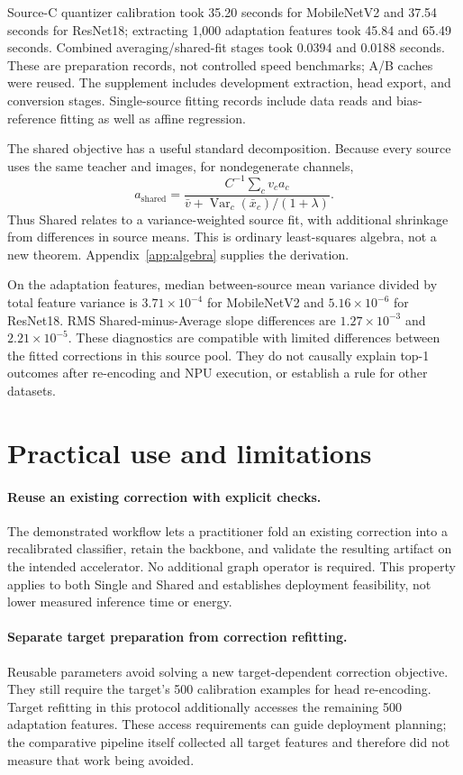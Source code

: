 \documentclass[10pt,twocolumn]{article}
\newcommand{\Var}{\operatorname{Var}}
\begin{document}
Source-C quantizer calibration took 35.20 seconds for MobileNetV2 and 37.54 seconds for ResNet18; extracting 1,000 adaptation features took 45.84 and 65.49 seconds. Combined averaging/shared-fit stages took 0.0394 and 0.0188 seconds. These are preparation records, not controlled speed benchmarks; A/B caches were reused. The supplement includes development extraction, head export, and conversion stages. Single-source fitting records include data reads and bias-reference fitting as well as affine regression.

The shared objective has a useful standard decomposition. Because every source uses the same teacher and images, for nondegenerate channels,
\begin{equation}
 a_{\mathrm{shared}}=
 \frac{C^{-1}\sum_c v_ca_c}
 {\bar v+\Var_c(\bar x_c)/(1+\lambda)}.
 \label{eq:decomposition}
\end{equation}
Thus Shared relates to a variance-weighted source fit, with additional shrinkage from differences in source means. This is ordinary least-squares algebra, not a new theorem. Appendix~\ref{app:algebra} supplies the derivation.

On the adaptation features, median between-source mean variance divided by total feature variance is $3.71\times10^{-4}$ for MobileNetV2 and $5.16\times10^{-6}$ for ResNet18. RMS Shared-minus-Average slope differences are $1.27\times10^{-3}$ and $2.21\times10^{-5}$. These diagnostics are compatible with limited differences between the fitted corrections in this source pool. They do not causally explain top-1 outcomes after re-encoding and NPU execution, or establish a rule for other datasets.

\section{Practical use and limitations}
\paragraph{Reuse an existing correction with explicit checks.}
The demonstrated workflow lets a practitioner fold an existing correction into a recalibrated classifier, retain the backbone, and validate the resulting artifact on the intended accelerator. No additional graph operator is required. This property applies to both Single and Shared and establishes deployment feasibility, not lower measured inference time or energy.

\paragraph{Separate target preparation from correction refitting.}
Reusable parameters avoid solving a new target-dependent correction objective. They still require the target's 500 calibration examples for head re-encoding. Target refitting in this protocol additionally accesses the remaining 500 adaptation features. These access requirements can guide deployment planning; the comparative pipeline itself collected all target features and therefore did not measure that work being avoided.
\end{document}
